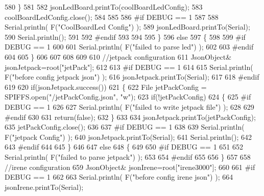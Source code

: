 \begin{DoxyCode}
580         \}
581         
582         jsonLedBoard.printTo(coolBoardLedConfig);
583         coolBoardLedConfig.close();
584 
585 
586 \textcolor{preprocessor}{    #if DEBUG == 1 }
587 
588         Serial.println( F(\textcolor{stringliteral}{"CoolBoardLed Config"}) );     
589         jsonLedBoard.printTo(Serial);
590         Serial.println();
591     
592 \textcolor{preprocessor}{    #endif}
593 
594     
595     \}
596     \textcolor{keywordflow}{else}
597     \{
598     
599 \textcolor{preprocessor}{    #if DEBUG == 1 }
600 
601         Serial.println( F(\textcolor{stringliteral}{"failed to parse led"}) );
602     
603 \textcolor{preprocessor}{    #endif }
604 
605     \}
606         
607 
608     
609 
610     \textcolor{comment}{//jetpack configuration}
611         JsonObject& jsonJetpack=root[\textcolor{stringliteral}{"jetPack"}];
612 
613 \textcolor{preprocessor}{#if DEBUG == 1 }
614 
615     Serial.println( F(\textcolor{stringliteral}{"before config jetpack json"}) );
616     jsonJetpack.printTo(Serial);
617 
618 \textcolor{preprocessor}{#endif}
619 
620     \textcolor{keywordflow}{if}(jsonJetpack.success())
621     \{   
622         File jetPackConfig = SPIFFS.open(\textcolor{stringliteral}{"/jetPackConfig.json"}, \textcolor{stringliteral}{"w"});   
623         \textcolor{keywordflow}{if}(!jetPackConfig)
624         \{
625 \textcolor{preprocessor}{        #if DEBUG == 1}
626 
627             Serial.println( F(\textcolor{stringliteral}{"failed to write jetpack file"}) );
628         
629 \textcolor{preprocessor}{        #endif}
630 
631             \textcolor{keywordflow}{return}(\textcolor{keyword}{false});
632         \}
633 
634         jsonJetpack.printTo(jetPackConfig);
635         jetPackConfig.close();
636 
637 \textcolor{preprocessor}{    #if DEBUG == 1}
638 
639         Serial.println( F(\textcolor{stringliteral}{"jetpack Config"}) );  
640         jsonJetpack.printTo(Serial);
641         Serial.println();
642     
643 \textcolor{preprocessor}{    #endif}
644 
645     \}
646 
647     \textcolor{keywordflow}{else}
648     \{
649     
650 \textcolor{preprocessor}{    #if DEBUG == 1 }
651 
652         Serial.println( F(\textcolor{stringliteral}{"failed to parse jetpack"}) ); 
653     
654 \textcolor{preprocessor}{    #endif}
655 
656     \}
657     
658     \textcolor{comment}{//irene configuration   }
659         JsonObject& jsonIrene=root[\textcolor{stringliteral}{"irene3000"}];
660     
661 \textcolor{preprocessor}{#if DEBUG == 1 }
662 
663     Serial.println( F(\textcolor{stringliteral}{"before config irene json"}) );    
664     jsonIrene.printTo(Serial);

\end{DoxyCode}
